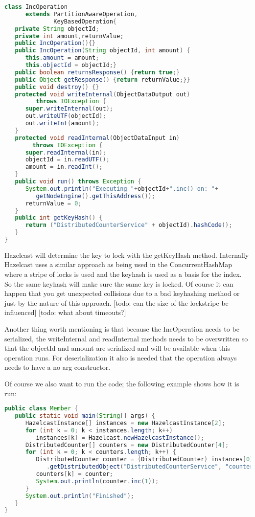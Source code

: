 \begin{lstlisting}[language=java]
class IncOperation 
      extends PartitionAwareOperation, 
              KeyBasedOperation{
   private String objectId;
   private int amount,returnValue;
   public IncOperation(){}
   public IncOperation(String objectId, int amount) {
      this.amount = amount;
      this.objectId = objectId;}
   public boolean returnsResponse() {return true;}
   public Object getResponse() {return returnValue;}}
   public void destroy() {}
   protected void writeInternal(ObjectDataOutput out) 
         throws IOException {
      super.writeInternal(out);
      out.writeUTF(objectId);
      out.writeInt(amount);
   }
   protected void readInternal(ObjectDataInput in) 
        throws IOException {
      super.readInternal(in);
      objectId = in.readUTF();
      amount = in.readInt();
   }
   public void run() throws Exception {
      System.out.println("Executing "+objectId+".inc() on: "+
         getNodeEngine().getThisAddress());            
      returnValue = 0;
   }
   public int getKeyHash() {
      return ("DistributedCounterService" + objectId).hashCode();
   }
}	
\end{lstlisting}
Hazelcast will determine the key to lock with the getKeyHash method. Internally Hazelcast uses a similar approach as being used in the ConcurrentHashMap where a stripe of locks is used and the keyhash is used as a basis for the index. So the same keyhash will make sure the same key is locked. Of course it can happen that you get unexpected collisions due to a bad keyhashing method or just by the nature of this approach. 
[todo: can the size of the lockstripe be influenced]
[todo: what about timeouts?]

Another thing worth mentioning is that because the IncOperation needs to be serialized, the writeInternal and readInternal methods needs to be overwritten so that the objectId and amount are serialized and will be available when this operation runs. For deserialization it also is needed that the operation always needs to have a no arg constructor.

Of course we also want to run the code; the following example shows how it is run:
\begin{lstlisting}[language=java]
public class Member {
   public static void main(String[] args) {
      HazelcastInstance[] instances = new HazelcastInstance[2];
      for (int k = 0; k < instances.length; k++) 
         instances[k] = Hazelcast.newHazelcastInstance();
      DistributedCounter[] counters = new DistributedCounter[4];
      for (int k = 0; k < counters.length; k++) {
         DistributedCounter counter = (DistributedCounter) instances[0]
            .getDistributedObject("DistributedCounterService", "counter" + k);
         counters[k] = counter;
         System.out.println(counter.inc(1));
      }
      System.out.println("Finished");
   }
}
\end{lstlisting}

